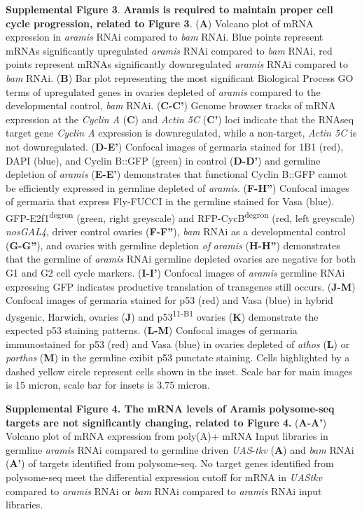 \documentclass[12pt,twoside]{reedthesis}
\begin{document}
\textbf{Supplemental Figure 3}. \textbf{Aramis is required to maintain proper cell
cycle progression, related to Figure 3}. (\textbf{A}) Volcano plot of mRNA
expression in \emph{aramis} RNAi compared to \emph{bam} RNAi. Blue points
represent mRNAs significantly upregulated \emph{aramis} RNAi compared to
\emph{bam} RNAi, red points represent mRNAs significantly downregulated
\emph{aramis} RNAi compared to \emph{bam} RNAi. (\textbf{B}) Bar plot representing the
most significant Biological Process GO terms of upregulated genes in
ovaries depleted of \emph{aramis} compared to the developmental control,
\emph{bam} RNAi. (\textbf{C-C'}) Genome browser tracks of mRNA expression at the
\emph{Cyclin} \emph{A} (\textbf{C}) and \emph{Actin 5C} (\textbf{C'}) loci indicate that the
RNAseq target gene \emph{Cyclin A} expression is downregulated, while a
non-target, \emph{Actin 5C} is not downregulated. (\textbf{D-E'}) Confocal images
of germaria stained for 1B1 (red), DAPI (blue), and Cyclin B::GFP
(green) in control (\textbf{D-D'}) and germline depletion of \emph{aramis}
(\textbf{E-E'}) demonstrates that functional Cyclin B::GFP cannot be
efficiently expressed in germline depleted of \emph{aramis}. (\textbf{F-H''})
Confocal images of germaria that express Fly-FUCCI in the germline
stained for Vasa (blue). GFP-E2f1\textsuperscript{degron} (green, right greyscale) and
RFP-CycB\textsuperscript{degron} (red, left greyscale) \emph{nosGAL4}, driver control ovaries
(\textbf{F-F''}), \emph{bam} RNAi as a developmental control (\textbf{G-G''}), and
ovaries with germline depletion \emph{of} \emph{aramis} (\textbf{H-H''}) demonstrates
that the germline of \emph{aramis} RNAi germline depleted ovaries are
negative for both G1 and G2 cell cycle markers. (\textbf{I-I'}) Confocal
images of \emph{aramis} germline RNAi expressing GFP indicates productive
translation of transgenes still occurs. (\textbf{J-M}) Confocal images of
germaria stained for p53 (red) and Vasa (blue) in hybrid dysgenic,
Harwich, ovaries (\textbf{J}) and p53\textsuperscript{11-B1} ovaries (\textbf{K}) demonstrate the
expected p53 staining patterns. (\textbf{L-M}) Confocal images of germaria
immunostained for p53 (red) and Vasa (blue) in ovaries depleted of
\emph{athos} (\textbf{L}) or \emph{porthos} (\textbf{M}) in the germline exibit p53 punctate
staining. Cells highlighted by a dashed yellow circle represent cells
shown in the inset. Scale bar for main images is 15 micron, scale bar
for insets is 3.75 micron.

\textbf{Supplemental Figure 4. The mRNA levels of Aramis polysome-seq targets
are not significantly changing, related to Figure 4.} (\textbf{A-A'})
Volcano plot of mRNA expression from poly(A)+ mRNA Input libraries in
germline \emph{aramis} RNAi compared to germline driven \emph{UAS}-\emph{tkv} (\textbf{A})
and \emph{bam} RNAi (\textbf{A'}) of targets identified from polysome-seq. No
target genes identified from polysome-seq meet the differential
expression cutoff for mRNA in \emph{UAStkv} compared to \emph{aramis} RNAi or
\emph{bam} RNAi compared to \emph{aramis} RNAi input libraries.
\end{document}
